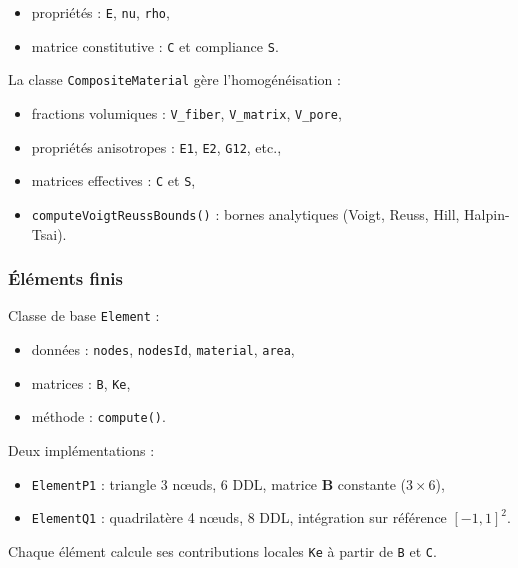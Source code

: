 \documentclass[a4paper,11pt]{article}
\begin{document}
\begin{itemize}
    \item[$\bullet$] propriétés : \texttt{E}, \texttt{nu}, \texttt{rho},
    \item[$\bullet$] matrice constitutive : \texttt{C} et compliance \texttt{S}.
\end{itemize}

La classe \texttt{CompositeMaterial} gère l’homogénéisation :

\begin{itemize}
    \item[$\bullet$] fractions volumiques : \texttt{V\_fiber}, \texttt{V\_matrix}, \texttt{V\_pore},
    \item[$\bullet$] propriétés anisotropes : \texttt{E1}, \texttt{E2}, \texttt{G12}, etc.,
    \item[$\bullet$] matrices effectives : \texttt{C} et \texttt{S},
    \item[$\bullet$] \texttt{computeVoigtReussBounds()} : bornes analytiques (Voigt, Reuss, Hill, Halpin-Tsai).
\end{itemize}

\subsubsection*{Éléments finis}

Classe de base \texttt{Element} :

\begin{itemize}
    \item[$\bullet$] données : \texttt{nodes}, \texttt{nodesId}, \texttt{material}, \texttt{area},
    \item[$\bullet$] matrices : \texttt{B}, \texttt{Ke},
    \item[$\bullet$] méthode : \texttt{compute()}.
\end{itemize}

Deux implémentations :

\begin{itemize}
    \item[$\bullet$] \texttt{ElementP1} :
    triangle 3 nœuds, 6 DDL, matrice $\mathbf{B}$ constante ($3 \times 6$),
    \item[$\bullet$] \texttt{ElementQ1} :
    quadrilatère 4 nœuds, 8 DDL, intégration sur référence $[-1,1]^2$.
\end{itemize}

Chaque élément calcule ses contributions locales \texttt{Ke} à partir de \texttt{B} et \texttt{C}.
\end{document}
